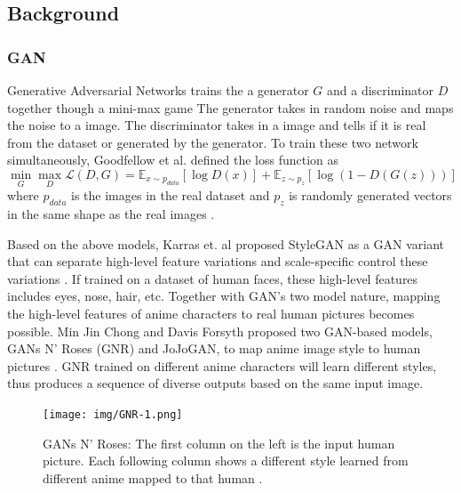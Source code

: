\subsection*{Background}

\subsubsection*{GAN}

Generative Adversarial Networks trains the a generator $G$ and a discriminator $D$ together though a mini-max game
The generator takes in random noise and maps the noise to a image.
The discriminator takes in a image and tells if it is real from the dataset or generated by the generator.
To train these two network simultaneously, Goodfellow et al. defined the loss function as 
$$
\min_G\max_{D}\mathcal{L}(D, G) = 
\mathbb{E}_{x \sim p_{data}}[\log D(x)] + 
\mathbb{E}_{z \sim p_z}[\log (1 - D(G(z)))]
$$
where $p_{data}$ is the images in the real dataset
and $p_z$ is randomly generated vectors in the same shape as the real images \cite{Goodfellow2020Generative}.

\par
Based on the above models, Karras et. al proposed StyleGAN as 
a GAN variant that can separate high-level feature variations and scale-specific control these variations \cite{Karras2019Style}.
If trained on a dataset of human faces, these high-level features includes eyes, nose, hair, etc.
Together with GAN's two model nature, mapping the high-level features of anime characters to real human pictures becomes possible.
Min Jin Chong and Davis Forsyth proposed two GAN-based models,
GANs N' Roses (GNR) and JoJoGAN,
to map anime image style to human pictures \cite{chong2021gans,chong2021jojogan}.
GNR trained on different anime characters will learn different styles,
thus produces a sequence of diverse outputs based on the same input image.
\begin{figure}[h]
    \texttt{[image: img/GNR-1.png]}
    \caption{
        GANs N' Roses: The first column on the left is the input human picture.
        Each following column shows a different style learned from different anime mapped to that human \cite{chong2021gans}.
    }
\end{figure}

